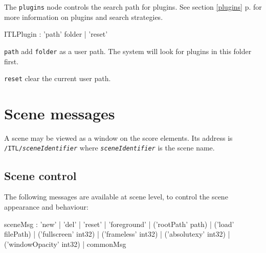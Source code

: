 \documentclass[a4paper,twoside]{report}
\newcommand{\toplevel}[1]	{\chapter{#1}}
\newcommand{\sublevel}[1]	{\section{#1}}
\newcommand{\fullref}[1]	{\ref{#1} p.\pageref{#1}}
\newcommand{\OSC}[1]		{\texttt{#1}}
\let\olditemize\itemize
\let\oldenditemize\enditemize
\renewenvironment{itemize} 	{\olditemize \setlength{\itemsep}{1mm}}{\oldenditemize}
\begin{document}
The \OSC{plugins} node controls the search path for plugins. See section \fullref{plugins} for more information on plugins and search strategies.

\begin{rail}
ITLPlugin : 'path'  folder
		| 'reset'
\end{rail}

\begin{itemize}
\item \OSC{path} add \OSC{folder} as a user path. The system will look for plugins in this folder first.
\item \OSC{reset} clear the current user path.
\end{itemize}


\toplevel{Scene messages}
\label{scene}
A scene may be viewed as a window on the score elements. Its address is \OSC{/ITL/\textit{sceneIdentifier}} where \OSC{\textit{sceneIdentifier}} is the scene name. 

\sublevel{Scene control}
The following messages are available at scene level, to control the scene appearance and behaviour:
\begin{rail}
sceneMsg :  'new'
			| 'del'
			| 'reset'
			| 'foreground'
			| ('rootPath' path) 
			| ('load' filePath)
			| ('fullscreen' int32)
			| ('frameless' int32)
			| ('absolutexy' int32)
			| ('windowOpacity' int32)
			| commonMsg
\end{rail}
\end{document}

